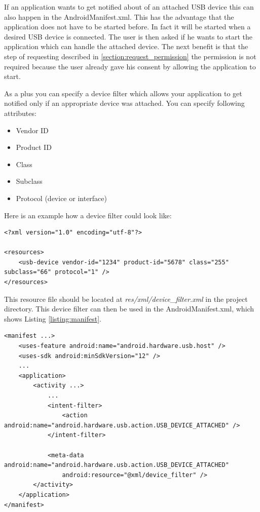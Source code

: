 If an application wants to get notified about of an attached USB device this can also happen in the AndroidManifest.xml. This has the advantage that the application does not have to be started before. In fact it will be started when a desired USB device is connected. The user is then asked if he wants to start the application which can handle the attached device. The next benefit is that the step of requesting described in \ref{section:request_permission} the permission is not required because the user already gave his consent by allowing the application to start.

As a plus you can specify a device filter which allows your application to get notified only if an appropriate device was attached. You can specify following attributes\cite{android_usb_host}:

\begin{itemize}
\item Vendor ID
\item Product ID
\item Class
\item Subclass
\item Protocol (device or interface)
\end{itemize}

Here is an example how a device filter could look like:

\lstset{language=XML}
\begin{lstlisting}[caption=Example device filter\cite{android_usb_host}, label=listing:device_filter]
<?xml version="1.0" encoding="utf-8"?>

<resources>
    <usb-device vendor-id="1234" product-id="5678" class="255" subclass="66" protocol="1" />
</resources>
\end{lstlisting}

This resource file should be located at \textit{res/xml/device\_filter.xml} in the project directory\cite{android_usb_host}. This device filter can then be used in the AndroidManifest.xml, which shows Listing \ref{listing:manifest}.

\begin{lstlisting}[caption=AndroidManifest.xml\cite{android_usb_host}, label=listing:manifest]
<manifest ...>
    <uses-feature android:name="android.hardware.usb.host" />
    <uses-sdk android:minSdkVersion="12" />
    ...
    <application>
        <activity ...>
            ...
            <intent-filter>
                <action android:name="android.hardware.usb.action.USB_DEVICE_ATTACHED" />
            </intent-filter>

            <meta-data android:name="android.hardware.usb.action.USB_DEVICE_ATTACHED"
                android:resource="@xml/device_filter" />
        </activity>
    </application>
</manifest>
\end{lstlisting}

